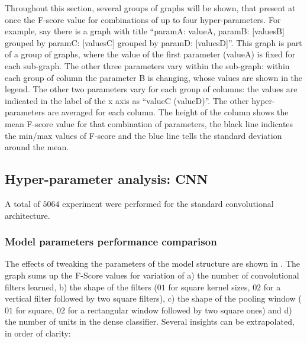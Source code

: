 Throughout this section, several groups of graphs will be shown, that present
at once the F-score value for combinations of up to four hyper-parameters.
For example, say there is a graph 
with title 
``paramA: valueA, paramB: [valuesB]
grouped by paramC: [valuesC]
grouped by paramD: [valuesD]''.
This graph is part of a group of graphs, where the value of the first parameter
(valueA) is fixed for each sub-graph.
The other three parameters vary within the sub-graph:
within each group of column the parameter B is changing,
whose values are shown in the legend.
The other two parameters vary for each group of columns:
the values are indicated in the label of the x axis as ``valueC (valueD)''.
The other hyper-parameters are averaged for each column.
The height of the column shows the mean F-score value for that
combination of parameters,
the black line indicates the min/max values of F-score and the
blue line tells the standard deviation around the mean.

\subsection{Hyper-parameter analysis: CNN}


A total of $5064$ experiment were performed for the standard convolutional
architecture.

\subsubsection{Model parameters performance comparison}

The effects of tweaking the parameters of the model structure are shown in
.
%
The graph sums up the F-Score values for variation of
%
a) the number of convolutional filters learned,
%
b) the shape of the filters ($01$ for square kernel sizes, $02$ for a vertical
filter followed by two square filters),
%
c) the shape of the pooling window ($01$ for square, $02$ for a rectangular
window followed by two square ones) and
%
d) the number of units in the dense classifier.
Several insights can be extrapolated, in order of clarity:

